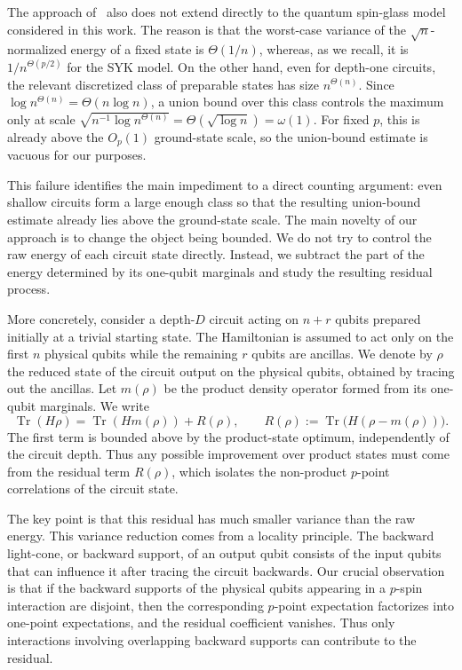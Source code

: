 \documentclass[12pt]{article}
\begin{document}
The approach of~\cite{anschuetz2025strongly} also does not extend directly to the quantum spin-glass model considered in this work. The reason is that the worst-case variance of the $\sqrt{n}$-normalized energy of a fixed state is  $\Theta(1/n)$, whereas, as we recall, it is $1/n^{\Theta(p/2)}$ for the SYK model. On the other hand, even for depth-one circuits, the relevant
discretized class of preparable states has size $n^{\Theta(n)}$. Since
$\log n^{\Theta(n)}=\Theta(n\log n)$, a union bound over this class controls
the maximum only at scale
$\sqrt{n^{-1}\log n^{\Theta(n)}}=\Theta(\sqrt{\log n})=\omega(1)$.
For fixed $p$, this is already above the $O_p(1)$ ground-state scale, so the union-bound estimate is vacuous for our purposes.


This failure identifies the main impediment to a direct counting argument: even shallow circuits form a large enough class so that the resulting union-bound estimate already lies above the ground-state scale. The main novelty of our approach is to change the object being bounded. We do not try to control the raw energy of each circuit state directly. Instead, we subtract the part of the energy determined by its one-qubit marginals and study the resulting residual process.

More concretely, consider a depth-$D$ circuit acting on $n+r$ qubits prepared initially at a trivial starting state.
The Hamiltonian is assumed to act only on the first $n$ physical qubits while the remaining $r$ qubits are ancillas. We denote by $\rho$ the reduced state of the circuit output on the physical qubits,
obtained by tracing out the ancillas. Let $m(\rho)$ be the product density operator formed from its one-qubit marginals. We write
\[
    \operatorname{Tr}(H\rho)
    =
    \operatorname{Tr}(Hm(\rho))
    +
    R(\rho),
    \qquad
    R(\rho):=\operatorname{Tr}\bigl(H(\rho-m(\rho))\bigr).
\]
The first term is bounded above by the product-state optimum, independently of the circuit depth. Thus any possible improvement
over product states must come from the residual term $R(\rho)$, which isolates
the non-product $p$-point correlations of the circuit state.

The key point is that this residual has much smaller variance than the raw
energy. This variance reduction comes from a locality principle. The backward
light-cone, or backward support, of an output qubit consists of the input
qubits that can influence it after tracing the circuit backwards. Our crucial observation is that if the backward supports of the physical qubits appearing in a $p$-spin interaction
are disjoint, then the corresponding $p$-point expectation factorizes into
one-point expectations, and the residual coefficient vanishes. Thus only
interactions involving overlapping backward supports can contribute to the
residual.
\end{document}
